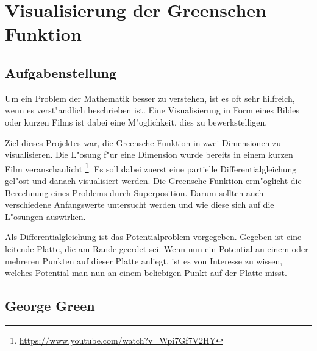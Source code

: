 \chapter{Visualisierung der Greenschen Funktion}
\begin{refsection}

\section{Aufgabenstellung}

Um ein Problem der Mathematik besser zu verstehen, ist es oft sehr
hilfreich, wenn es verst"andlich beschrieben ist. Eine Visualisierung
in Form eines Bildes oder kurzen Films ist dabei eine M"oglichkeit,
dies zu bewerkstelligen.
	
Ziel dieses Projektes war, die Greensche Funktion in zwei Dimensionen
zu visualisieren. Die L"osung f"ur eine Dimension wurde bereits in
einem kurzen Film veranschaulicht
\footnote{\url{https://www.youtube.com/watch?v=Wpi7Gf7V2HY}}. Es
soll dabei zuerst eine partielle Differentialgleichung gel"ost und
danach visualisiert werden. Die Greensche Funktion erm"oglicht die
Berechnung eines Problems durch Superposition. Darum sollten auch
verschiedene Anfangswerte untersucht werden und wie diese sich auf
die L"osungen auswirken.
	
Als Differentialgleichung ist das Potentialproblem vorgegeben.
Gegeben ist eine leitende Platte, die am Rande geerdet sei. Wenn
nun ein Potential an einem oder mehreren Punkten auf dieser Platte
anliegt, ist es von Interesse zu wissen, welches Potential man nun
an einem beliebigen Punkt auf der Platte misst.

\section{George Green}


\end{refsection}
